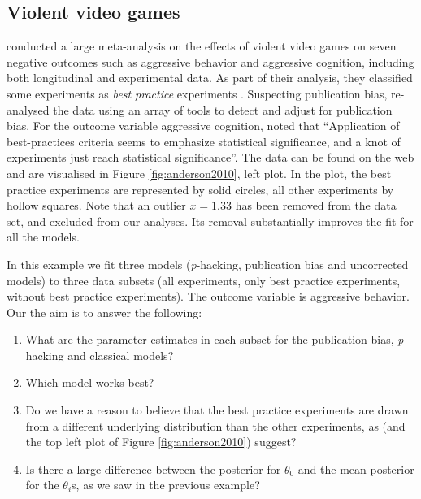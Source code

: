 \documentclass{article}
\theoremstyle{plain}
\theoremstyle{definition}
\begin{document}
\subsection{Violent video games\label{subsec:Anderson}}

\citet{anderson2010violent} conducted a large meta-analysis on the effects of violent video games on seven negative outcomes such as aggressive behavior and aggressive cognition, including both longitudinal and experimental data. As part of their analysis, they classified some experiments as \emph{best practice} experiments  \citep[for more details, see Table 2 of][]{anderson2010violent}. Suspecting publication bias, \citet{hilgard2017overstated} re-analysed the data using an array of tools to detect and adjust for publication bias. For the outcome variable aggressive cognition, \citet{hilgard2017overstated} noted that ``Application of best-practices criteria seems to emphasize statistical significance, and a knot of experiments just reach statistical significance''. The data can be found on the web \citep{Hilgard2017} and are visualised in Figure \ref{fig:anderson2010}, left plot. In the plot, the best practice experiments are represented by solid circles, all other experiments by hollow squares. Note that an outlier $x=1.33$ has been removed from the data set, and excluded from our analyses. Its removal substantially improves the fit for all the models. 

In this example we fit three models (\textit{p}-hacking, publication bias and uncorrected models) to three data subsets (all experiments, only best practice experiments, without best practice experiments). The outcome variable is aggressive behavior. Our the aim is to answer the following:
\begin{enumerate}
\item What are the parameter estimates in each subset for the publication bias, \textit{p}-hacking and classical models?
\item Which model works best?
\item Do we have a reason to believe that the best practice experiments are drawn from a different underlying distribution than the other experiments, as \citet{hilgard2017overstated} (and the top left plot of Figure \ref{fig:anderson2010}) suggest?
\item Is there a large difference between the posterior for $\theta_{0}$ and the mean posterior for the $\theta_{i}$s, as we saw in the previous example?
\end{enumerate}
\end{document}
